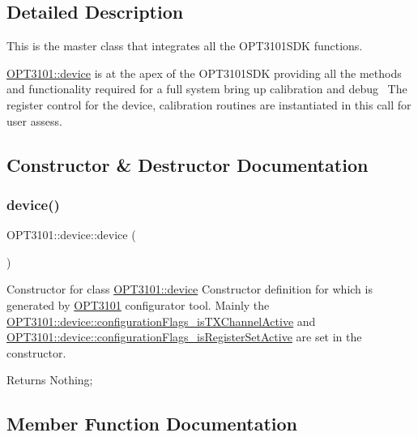 \subsection{Detailed Description}
This is the master class that integrates all the O\+P\+T3101\+S\+DK functions. 

\mbox{\hyperlink{class_o_p_t3101_1_1device}{O\+P\+T3101\+::device}} is at the apex of the O\+P\+T3101\+S\+DK providing all the methods and functionality required for a full system bring up calibration and debug~\newline
 The register control for the device, calibration routines are instantiated in this call for user assess. 

\subsection{Constructor \& Destructor Documentation}
\mbox{\label{class_o_p_t3101_1_1device_a10acd9ff9c81c5d113d72a331ced450b}} 
\subsubsection{\texorpdfstring{device()}{device()}}
{\footnotesize\ttfamily O\+P\+T3101\+::device\+::device (\begin{DoxyParamCaption}{ }\end{DoxyParamCaption})}



Constructor for class \mbox{\hyperlink{class_o_p_t3101_1_1device}{O\+P\+T3101\+::device}} Constructor definition for which is generated by \mbox{\hyperlink{namespace_o_p_t3101}{O\+P\+T3101}} configurator tool. Mainly the \mbox{\hyperlink{class_o_p_t3101_1_1device_aa911b5cc3747694d63c55a84b84dccd5}{O\+P\+T3101\+::device\+::configuration\+Flags\+\_\+is\+T\+X\+Channel\+Active}} and \mbox{\hyperlink{class_o_p_t3101_1_1device_a11813c9f13a5c970aa70d3318c4118b1}{O\+P\+T3101\+::device\+::configuration\+Flags\+\_\+is\+Register\+Set\+Active}} are set in the constructor. 

\begin{DoxyReturn}{Returns}
Nothing; 
\end{DoxyReturn}


\subsection{Member Function Documentation}
\mbox{\label{class_o_p_t3101_1_1device_a3b278687f5414b66c614d83dcf229f80}} 
